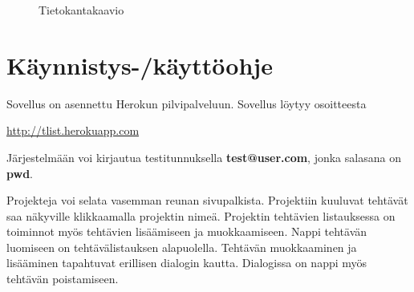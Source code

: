 \documentclass[12pt,a4paper,oneside,titlepage,pdftex]{article}
\begin{document}
\begin{figure}[htbp]
\begin{center}
\caption{Tietokantakaavio}
\label{tietokantakaavio}
\end{center}
\end{figure}

\section{Käynnistys-/käyttöohje}

Sovellus on asennettu Herokun pilvipalveluun. Sovellus löytyy osoitteesta

\begin{center}\url{http://tlist.herokuapp.com}\end{center}

Järjestelmään voi kirjautua testitunnuksella \textbf{test@user.com}, jonka salasana on \textbf{pwd}.

Projekteja voi selata vasemman reunan sivupalkista. Projektiin kuuluvat tehtävät saa näkyville klikkaamalla projektin nimeä. Projektin tehtävien listauksessa on toiminnot myös tehtävien lisäämiseen ja muokkaamiseen. Nappi tehtävän luomiseen on tehtävälistauksen alapuolella. Tehtävän muokkaaminen ja lisääminen tapahtuvat erillisen dialogin kautta. Dialogissa on nappi myös tehtävän poistamiseen.
\end{document}
